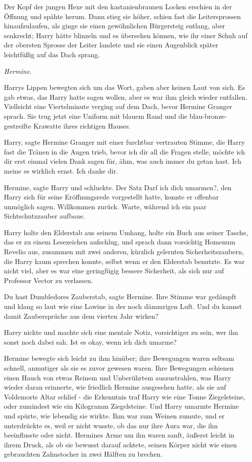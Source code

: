 Der Kopf der jungen Hexe mit den kastanienbraunen Locken erschien in der Öffnung
und spähte herum. Dann stieg sie höher, schien fast die Leitersprossen
hinaufzulaufen, als ginge sie einen gewöhnlichen Bürgersteig entlang, aber
senkrecht; Harry hätte blinzeln und es übersehen können, wie ihr einer Schuh auf
der obersten Sprosse der Leiter landete und sie einen Augenblick später
leichtfüßig auf das Dach sprang.

\emph{Hermine}.

Harrys Lippen bewegten sich um das Wort, gaben aber keinen Laut von sich. Es gab
etwas, das Harry hatte sagen wollen, aber es war ihm gleich wieder entfallen.
Vielleicht eine Viertelminute verging auf dem Dach, bevor Hermine Granger
sprach. Sie trug jetzt eine Uniform mit blauem Rand und die
blau-bronze-gestreifte Krawatte ihres richtigen Hauses.

\glqq{}Harry\grqq{}, sagte Hermine Granger mit einer furchtbar vertrauten Stimme,
die Harry fast die Tränen in die Augen trieb, \glqq{}bevor ich dir all die Fragen
stelle, möchte ich dir erst einmal vielen Dank sagen für, ähm, was auch immer du
getan hast. Ich meine es wirklich ernst. Ich danke dir.\grqq{}

\glqq{}Hermine\grqq{}, sagte Harry und schluckte. Der Satz \glqq{}Darf ich dich
umarmen?\grqq{}, den Harry sich für seine Eröffnungsrede vorgestellt hatte,
konnte er offenbar unmöglich sagen. \glqq{}Willkommen zurück. Warte, während ich
ein paar Sichtschutzzauber aufbaue.\grqq{}

Harry holte den Elderstab aus seinem Umhang, holte ein Buch aus seiner Tasche,
das er zu einem Lesezeichen aufschlug, und sprach dann vorsichtig \glqq{}Homenum
Revelio\grqq{} aus, zusammen mit zwei anderen, kürzlich gelernten
Sicherheitszaubern, die Harry kaum sprechen konnte, selbst wenn er den Elderstab
benutzte. Es war nicht viel, aber es war eine geringfügig bessere Sicherheit,
als sich nur auf Professor Vector zu verlassen.

\glqq{}Du hast Dumbledores Zauberstab\grqq{}, sagte Hermine. Ihre Stimme war
gedämpft und klang so laut wie eine Lawine in der noch dämmrigen Luft. \glqq{}Und
du kannst damit Zaubersprüche aus dem vierten Jahr wirken?\grqq{}

Harry nickte und machte sich eine mentale Notiz, vorsichtiger zu sein, wer ihn
sonst noch dabei sah. \glqq{}Ist es okay, wenn ich dich umarme?\grqq{}

Hermine bewegte sich leicht zu ihm hinüber; ihre Bewegungen waren seltsam
schnell, anmutiger als sie es zuvor gewesen waren. Ihre Bewegungen schienen
einen Hauch von etwas Reinem und Unberührtem auszustrahlen, was Harry wieder
daran erinnerte, wie friedlich Hermine ausgesehen hatte, als sie auf Voldemorts
Altar schlief - die Erkenntnis traf Harry wie eine Tonne Ziegelsteine, oder
zumindest wie ein Kilogramm Ziegelsteine. Und Harry umarmte Hermine und spürte,
wie lebendig sie wirkte. Ihm war zum Weinen zumute, und er unterdrückte es, weil
er nicht wusste, ob das nur ihre Aura war, die ihn beeinflusste oder nicht.
Hermines Arme um ihn waren sanft, äußerst leicht in ihrem Druck, als ob sie
bewusst darauf achtete, seinen Körper nicht wie einen gebrauchten Zahnstocher in
zwei Hälften zu brechen.

